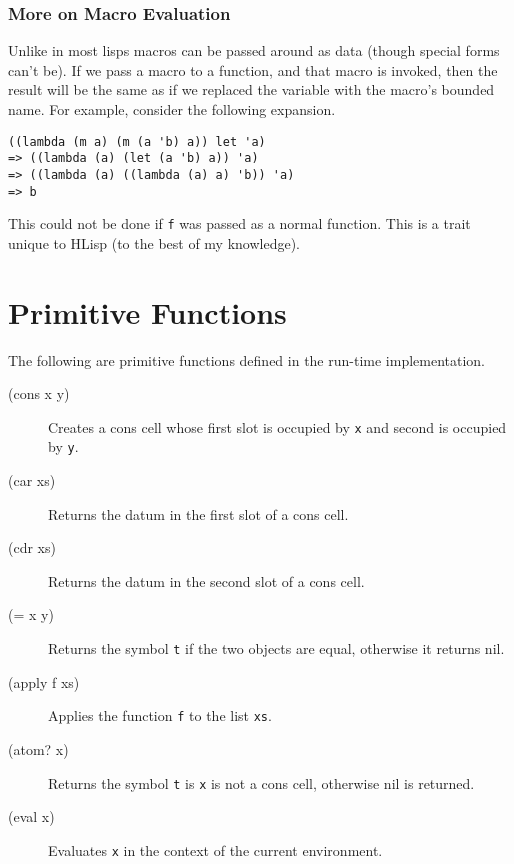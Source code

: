 \documentclass[12pt]{article}
\begin{document}
\subsubsection{More on Macro Evaluation}

Unlike in most lisps macros can be passed around as data (though special forms
can't be). If we pass a macro to a function, and that macro is invoked, then the
result will be the same as if we replaced the variable with the macro's bounded
name. For example, consider the following expansion.

\begin{verbatim}
((lambda (m a) (m (a 'b) a)) let 'a)
=> ((lambda (a) (let (a 'b) a)) 'a)
=> ((lambda (a) ((lambda (a) a) 'b)) 'a)
=> b
\end{verbatim}

This could not be done if \verb!f! was passed as a normal function. This is a
trait unique to HLisp (to the best of my knowledge).

\section{Primitive Functions}

The following are primitive functions defined in the run-time implementation.

\begin{description}
\item[(cons x y)] Creates a cons cell whose first slot is occupied by \verb!x!
  and second is occupied by \verb!y!.

\item[(car xs)] Returns the datum in the first slot of a cons cell.

\item[(cdr xs)] Returns the datum in the second slot of a cons cell.

\item[(= x y)] Returns the symbol \verb!t! if the two objects are equal,
  otherwise it returns nil.

\item[(apply f xs)] Applies the function \verb!f! to the list \verb!xs!.

\item[(atom? x)] Returns the symbol \verb!t! is \verb!x! is not a cons cell,
  otherwise nil is returned.

\item[(eval x)] Evaluates \verb!x! in the context of the current environment.
\end{description}
\end{document}
